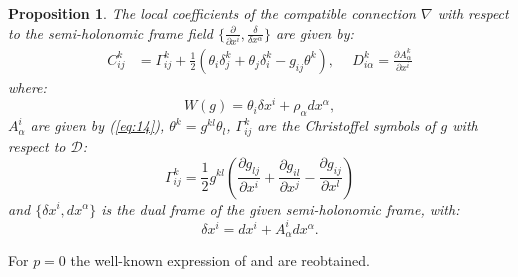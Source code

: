 \documentclass[11pt,oneside,english]{amsart}
\numberwithin{equation}{section}
\numberwithin{figure}{section}
\theoremstyle{plain}
\theoremstyle{definition}
\theoremstyle{definition}
\theoremstyle{plain}
\newtheorem{prop}[thm]{Proposition}
\theoremstyle{plain}
\theoremstyle{remark}
\theoremstyle{remark}
\begin{document}
\medskip{}

\begin{prop}
The local coefficients of the compatible connection $\nabla$ with
respect to the semi-holonomic frame field $\{\frac{\partial}{\partial x^{i}},\frac{\delta}{\delta x^{\alpha}}\}$
are given by: \begin{eqnarray}
C_{ij}^{k} & =\Gamma_{ij}^{k}+\frac{1}{2}(\theta_{i}\delta_{j}^{k}+\theta_{j}\delta_{i}^{k}-g_{ij}\theta^{k}), & \ \ D_{i\alpha}^{k}=\frac{\partial A_{\alpha}^{k}}{\partial x^{i}}\label{eq:16}\end{eqnarray}
 where: \begin{equation}
W(g)=\theta_{i}\delta x^{i}+\rho_{\alpha}dx^{\alpha},\label{eq:17}\end{equation}
 $A_{\alpha}^{i}$ are given by (\ref{eq:14}), $\theta^{k}=g^{kl}\theta_{l}$,
$\Gamma_{ij}^{k}$ are the Christoffel symbols of $g$ with respect
to $\mathcal{D}$: \begin{equation}
\Gamma_{ij}^{k}=\frac{1}{2}g^{kl}\left(\frac{\partial g_{lj}}{\partial x^{i}}+\frac{\partial g_{il}}{\partial x^{j}}-\frac{\partial g_{ij}}{\partial x^{l}}\right)\label{eq:18}\end{equation}
 and $\{\delta x^{i},dx^{\alpha}\}$ is the dual frame of the given
semi-holonomic frame, with: \begin{equation}
\delta x^{i}=dx^{i}+A_{\alpha}^{i}dx^{\alpha}.\label{eq:19}\end{equation}

\end{prop}
For $p=0$ the well-known expression of \cite{f:l} and \cite{Sen}
are reobtained.

\medskip{}
\end{document}
